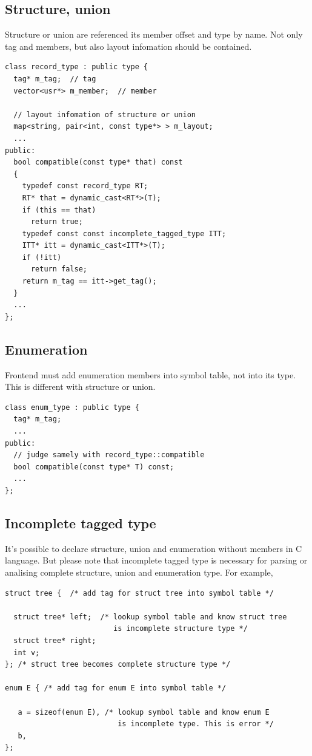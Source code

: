 \subsection{Structure, union}

Structure or union are referenced its member offset and type by name.
Not only tag and members, but also layout infomation should be
contained.

\begin{verbatim}
class record_type : public type {
  tag* m_tag;  // tag
  vector<usr*> m_member;  // member

  // layout infomation of structure or union
  map<string, pair<int, const type*> > m_layout;
  ...
public:
  bool compatible(const type* that) const
  {
    typedef const record_type RT;
    RT* that = dynamic_cast<RT*>(T);
    if (this == that)
      return true;
    typedef const const incomplete_tagged_type ITT;
    ITT* itt = dynamic_cast<ITT*>(T);
    if (!itt)
      return false;
    return m_tag == itt->get_tag();
  }
  ...
};
\end{verbatim}

\subsection{Enumeration}

Frontend must add enumeration members into symbol table, not into
its type. This is different with structure or union. 
\begin{verbatim}
class enum_type : public type {
  tag* m_tag;
  ...
public:
  // judge samely with record_type::compatible
  bool compatible(const type* T) const;
  ...
};
\end{verbatim}

\subsection{Incomplete tagged type}

It's possible to declare structure, union and enumeration without
members in C language. But please note that incomplete tagged type
is necessary for parsing or analising
complete structure, union and enumeration type.
For example,
\begin{verbatim}
struct tree {  /* add tag for struct tree into symbol table */

  struct tree* left;  /* lookup symbol table and know struct tree
                         is incomplete structure type */
  struct tree* right;
  int v;
}; /* struct tree becomes complete structure type */

enum E { /* add tag for enum E into symbol table */

   a = sizeof(enum E), /* lookup symbol table and know enum E
                          is incomplete type. This is error */
   b,
};
\end{verbatim}

